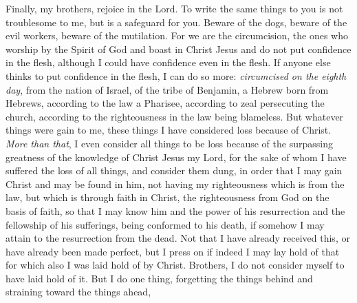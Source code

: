 \begin{biblechapter} %
 Finally, my brothers, rejoice in the Lord. To write the same things to you is not troublesome to me, but is a safeguard for you.
\verse Beware of the dogs, beware of the evil workers, beware of the mutilation.
\verse For we are the circumcision, the ones who worship by the Spirit of God and boast in Christ Jesus and do not put confidence in the flesh,
\verse although I could have confidence even in the flesh.
 If anyone else thinks to put confidence in the flesh, I can do so more:
\verse \textit{circumcised on the eighth day}, from the nation of Israel, of the tribe of Benjamin, a Hebrew born from Hebrews, according to the law a Pharisee,
\verse according to zeal persecuting the church, according to the righteousness in the law being blameless.
\verse But whatever things were gain to me, these things I have considered loss because of Christ.
\verse \textit{More than that}, I even consider all things to be loss because of the surpassing greatness of the knowledge of Christ Jesus my Lord, for the sake of whom I have suffered the loss of all things, and consider them dung, in order that I may gain Christ
\verse and may be found in him, not having my righteousness which is from the law, but which is through faith in Christ, the righteousness from God on the basis of faith,
\verse so that I may know him and the power of his resurrection and the fellowship of his sufferings, being conformed to his death,
\verse if somehow I may attain to the resurrection from the dead.
\verse Not that I have already received this, or have already been made perfect, but I press on if indeed I may lay hold of that for which also I was laid hold of by Christ.
\verse Brothers, I do not consider myself to have laid hold of it. But I do one thing, forgetting the things behind and straining toward the things ahead,

\end{biblechapter}

